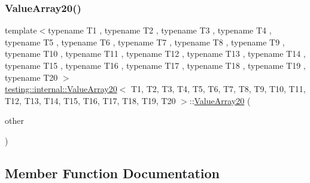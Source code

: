 \subsubsection{\texorpdfstring{ValueArray20()}{ValueArray20()}\hspace{0.1cm}{\footnotesize\ttfamily [2/2]}}
{\footnotesize\ttfamily template$<$typename T1 , typename T2 , typename T3 , typename T4 , typename T5 , typename T6 , typename T7 , typename T8 , typename T9 , typename T10 , typename T11 , typename T12 , typename T13 , typename T14 , typename T15 , typename T16 , typename T17 , typename T18 , typename T19 , typename T20 $>$ \\
\mbox{\hyperlink{classtesting_1_1internal_1_1ValueArray20}{testing\+::internal\+::\+Value\+Array20}}$<$ T1, T2, T3, T4, T5, T6, T7, T8, T9, T10, T11, T12, T13, T14, T15, T16, T17, T18, T19, T20 $>$\+::\mbox{\hyperlink{classtesting_1_1internal_1_1ValueArray20}{Value\+Array20}} (\begin{DoxyParamCaption}\item[{const \mbox{\hyperlink{classtesting_1_1internal_1_1ValueArray20}{Value\+Array20}}$<$ T1, T2, T3, T4, T5, T6, T7, T8, T9, T10, T11, T12, T13, T14, T15, T16, T17, T18, T19, T20 $>$ \&}]{other }\end{DoxyParamCaption})\hspace{0.3cm}{\ttfamily [inline]}}



\subsection{Member Function Documentation}
\mbox{\label{classtesting_1_1internal_1_1ValueArray20_abcf63e97d31f62868dab49f1667e9d4f}} 
